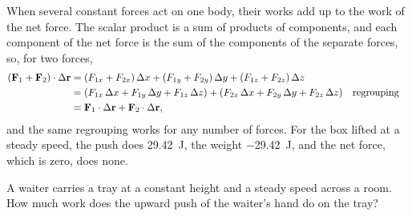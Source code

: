 When several constant forces act on one body, their works add up to the
work of the net force. The scalar product is a sum of products of
components, and each component of the net force is the sum of the
components of the separate forces, so, for two forces,
\begin{align*}
   (\bm{\mathrm{F}}_1 + \bm{\mathrm{F}}_2)\cdot\Delta\bm{\mathrm{r}}
   &= (F_{1x} + F_{2x})\,\Delta x + (F_{1y} + F_{2y})\,\Delta y
      + (F_{1z} + F_{2z})\,\Delta z\\
   &= (F_{1x}\,\Delta x + F_{1y}\,\Delta y + F_{1z}\,\Delta z)
      + (F_{2x}\,\Delta x + F_{2y}\,\Delta y + F_{2z}\,\Delta z)
      && \text{regrouping}\\
   &= \bm{\mathrm{F}}_1\cdot\Delta\bm{\mathrm{r}} + \bm{\mathrm{F}}_2\cdot\Delta\bm{\mathrm{r}} ,
\end{align*}
and the same regrouping works for any number of forces. For the box lifted
at a steady speed, the push does \SI{29.42}{\joule}, the weight
\SI{-29.42}{\joule}, and the net force, which is zero, does none.

\begin{selfcheck}
A waiter carries a tray at a constant height and a steady speed across a
room. How much work does the upward push of the waiter's hand do on the
tray?
\end{selfcheck}

